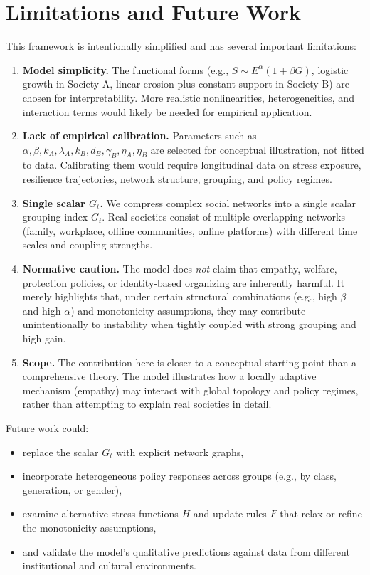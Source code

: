 \documentclass[11pt]{article}
\theoremstyle{plain}
\begin{document}
\section{Limitations and Future Work}

This framework is intentionally simplified and has several important limitations:

\begin{enumerate}
  \item \textbf{Model simplicity.}  
  The functional forms (e.g., $S \sim E^\alpha(1+\beta G)$, logistic growth in Society A, linear erosion plus constant support in Society B) are chosen for interpretability.
  More realistic nonlinearities, heterogeneities, and interaction terms would likely be needed for empirical application.

  \item \textbf{Lack of empirical calibration.}  
  Parameters such as $\alpha, \beta, k_A, \lambda_A, k_B, d_B, \gamma_B, \eta_A, \eta_B$ are selected for conceptual illustration, not fitted to data.
  Calibrating them would require longitudinal data on stress exposure, resilience trajectories, network structure, grouping, and policy regimes.

  \item \textbf{Single scalar $G_t$.}  
  We compress complex social networks into a single scalar grouping index $G_t$.
  Real societies consist of multiple overlapping networks (family, workplace, offline communities, online platforms) with different time scales and coupling strengths.

  \item \textbf{Normative caution.}  
  The model does \emph{not} claim that empathy, welfare, protection policies, or identity-based organizing are inherently harmful.
  It merely highlights that, under certain structural combinations (e.g., high $\beta$ and high $\alpha$) and monotonicity assumptions, they may contribute unintentionally to instability when tightly coupled with strong grouping and high gain.

  \item \textbf{Scope.}  
  The contribution here is closer to a conceptual starting point than a comprehensive theory.
  The model illustrates how a locally adaptive mechanism (empathy) may interact with global topology and policy regimes, rather than attempting to explain real societies in detail.
\end{enumerate}

Future work could:
\begin{itemize}
  \item replace the scalar $G_t$ with explicit network graphs,
  \item incorporate heterogeneous policy responses across groups (e.g., by class, generation, or gender),
  \item examine alternative stress functions $H$ and update rules $F$ that relax or refine the monotonicity assumptions,
  \item and validate the model's qualitative predictions against data from different institutional and cultural environments.
\end{itemize}
\end{document}
